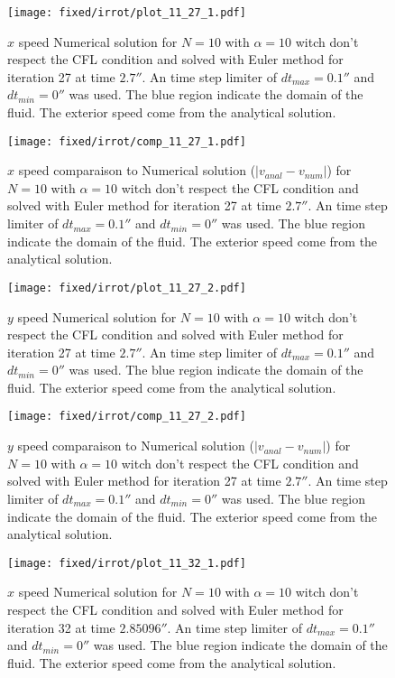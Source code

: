 \begin{figure}
\texttt{[image: fixed/irrot/plot\_11\_27\_1.pdf]}
\caption{$x$ speed Numerical solution for $N=10$ with $\alpha=10$ witch don't respect the CFL condition and solved with Euler method
for iteration 27 at time $\unit{2.7}{\second}$.
An time step limiter of $dt_{max}=\unit{0.1}{\second}$ and $dt_{min}=\unit{0}{\second}$ was used.
The blue region indicate the domain of the fluid. The exterior speed come from the analytical solution.
\label{fix:plot_11_27_1}
}
\end{figure}

\begin{figure}
\texttt{[image: fixed/irrot/comp\_11\_27\_1.pdf]}
\caption{$x$ speed comparaison to Numerical solution ($|v_{anal}-v_{num}|$) for $N=10$ with $\alpha=10$ witch don't respect the CFL condition and solved with Euler method
for iteration 27 at time $\unit{2.7}{\second}$.
An time step limiter of $dt_{max}=\unit{0.1}{\second}$ and $dt_{min}=\unit{0}{\second}$ was used.
The blue region indicate the domain of the fluid. The exterior speed come from the analytical solution.
\label{fix:comp_11_27_1}
}
\end{figure}

\begin{figure}
\texttt{[image: fixed/irrot/plot\_11\_27\_2.pdf]}
\caption{$y$ speed Numerical solution for $N=10$ with $\alpha=10$ witch don't respect the CFL condition and solved with Euler method
for iteration 27 at time $\unit{2.7}{\second}$.
An time step limiter of $dt_{max}=\unit{0.1}{\second}$ and $dt_{min}=\unit{0}{\second}$ was used.
The blue region indicate the domain of the fluid. The exterior speed come from the analytical solution.
\label{fix:plot_11_27_2}
}
\end{figure}

\begin{figure}
\texttt{[image: fixed/irrot/comp\_11\_27\_2.pdf]}
\caption{$y$ speed comparaison to Numerical solution ($|v_{anal}-v_{num}|$) for $N=10$ with $\alpha=10$ witch don't respect the CFL condition and solved with Euler method
for iteration 27 at time $\unit{2.7}{\second}$.
An time step limiter of $dt_{max}=\unit{0.1}{\second}$ and $dt_{min}=\unit{0}{\second}$ was used.
The blue region indicate the domain of the fluid. The exterior speed come from the analytical solution.
\label{fix:comp_11_27_2}
}
\end{figure}

\begin{figure}
\texttt{[image: fixed/irrot/plot\_11\_32\_1.pdf]}
\caption{$x$ speed Numerical solution for $N=10$ with $\alpha=10$ witch don't respect the CFL condition and solved with Euler method
for iteration 32 at time $\unit{2.85096}{\second}$.
An time step limiter of $dt_{max}=\unit{0.1}{\second}$ and $dt_{min}=\unit{0}{\second}$ was used.
The blue region indicate the domain of the fluid. The exterior speed come from the analytical solution.
\label{fix:plot_11_32_1}
}
\end{figure}


